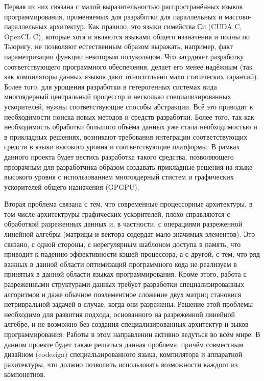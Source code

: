 \documentclass[12pt]{article}  %
\theoremstyle{remark}
\begin{document}
Первая из них связана с малой выразительностью распространённых языков программирования, применяемых для разработки для параллельных и массово-параллельных архитектур. Как правило, это языки симейства Си (CUDA C, OpenCL C), которые хотя и являются языками общего назначения и полны по Тьюригу, не позволяют естественным образом выражать, например, факт параметризации функции некоторым полукольцом. Что затрдняет разработку соответствующего программного обеспечения, делает его менее надёжным (так как компиляторы данных языков дают относитльено мало статических гарантий). Более того, для урощения разработки в гетерогенных системах вида многоядерный центральный процессор и несколько специализированных ускорителей, нужны соответствующие способы абстракции. Всё это приводит к необходимости поиска новых методов и средств разработки. Более того, так как необходимость обработки большого объёма данных уже стала необходимостью и в прикладных решениях, возникают требования интеграции соответствующих средств в языки высокого уровня и соответствующие платформы. В рамках данного проекта будет вестись разработка такого средства, позволяющего прозрачным для разработчика образом создавать прикладные решения на языке высокого уровня с использованием многоядерный стистем и графических ускорителей общего назначения (GPGPU).  

Вторая проблема связана с тем, что современные процессорные архитектуры, в том числе архитектруры графических ускорителей, плохо справляются с обработкой разреженных данных и, в частности, с операциями разреженной линейной алгебры (матрицы и вектора содердат мало значимых элементов). Это связано, с одной стороны, с нерегулярным шаблоном доступа в память, что приводит к падению эффективности кэшей процессора, а с другой, с тем, что ряд важных в данной области оптимизаций программного кода не реализуем в принятых в данной области языках программирования. Кроме этого, работа с разреженными структурами данных требует разработки специализированных алгоритмов и даже обычное поэлементное сложение двух матриц становися нетривральной задачей в случае, когда они разрежены. Решение этой проблемы необходимо для развития подхода, основанного на разреженной линейной алгебре, и не возможно без создания специализированных архитектур и зыков программирования. Работы в этом направлении активно ведуться во всём мире. В данном проекте будет также решаться данная проблема, причём совместным дизайном (codesign) специальзированного языка, компилятора и аппаратной рахитектуры, что должно позволить использовать возможности каждого из компонетнов. 
\end{document}
